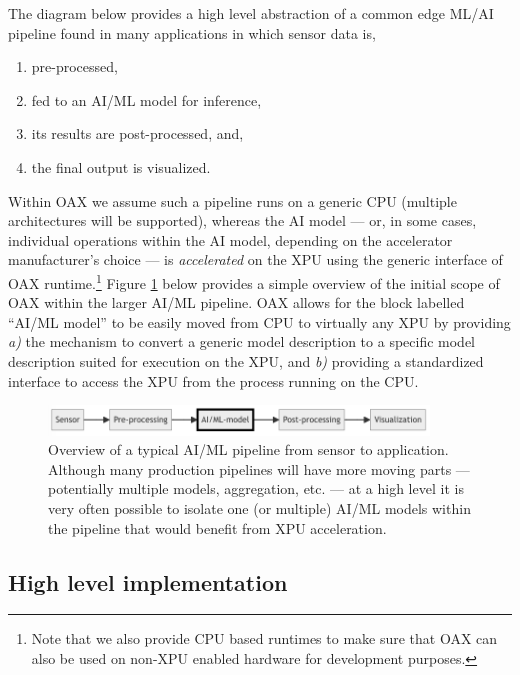 \documentclass{article}
\begin{document}
The diagram below provides a high level abstraction of a common edge ML/AI pipeline found in many applications in which sensor data is, 
\begin{enumerate}
\item pre-processed, 
\item fed to an AI/ML model for inference, 
\item its results are post-processed, and, 
\item the final output is visualized. 
\end{enumerate}

Within OAX we assume such a pipeline runs on a generic CPU (multiple architectures will be supported), whereas the AI model --- or, in some cases, individual operations within the AI model, depending on the accelerator manufacturer's choice --- is \emph{accelerated} on the XPU using the generic interface of OAX runtime.\footnote{Note that we also provide CPU based runtimes to make sure that OAX can also be used on non-XPU enabled hardware for development purposes.} Figure \ref{fig-pipeline} below provides a simple overview of the initial scope of OAX within the larger AI/ML pipeline. OAX allows for the block labelled ``AI/ML model'' to be easily moved from CPU to virtually any XPU by providing \emph{a)} the mechanism to convert a generic model description to a specific model description suited for execution on the XPU, and \emph{b)} providing a standardized interface to access the XPU from the process running on the CPU.

\begin{figure} [!htbp]
\centering
\includegraphics[width=0.9\textwidth]{img/pipeline}
\caption{Overview of a typical AI/ML pipeline from sensor to application. Although many production pipelines will have more moving parts --- potentially multiple models, aggregation, etc. --- at a high level it is very often possible to isolate one (or multiple) AI/ML models within the pipeline that would benefit from XPU acceleration.}
\label{fig-pipeline}
\end{figure}

\subsection{High level implementation}
\end{document}
